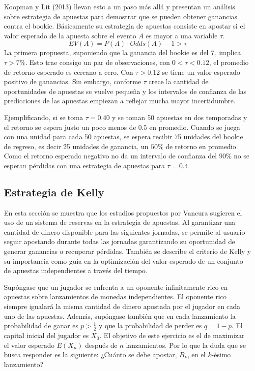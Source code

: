Koopman y Lit (2013) \cite{koopman2013dynamic} llevan esto a un paso más allá y presentan un análisis sobre estrategia de apuestas para demostrar que se pueden obtener ganancias contra el bookie. Básicamente su estrategia de apuestas consiste en apostar si el valor esperado de la apuesta sobre el evento $A$ es mayor a una variable $\tau$.
\[EV(A) = P(A) \cdot Odds(A) - 1 > \tau\]
La primera propuesta, suponiendo que la ganancia del bookie es del $7\/$, implica $\tau > 7\%$. Esto trae consigo un par de observaciones, con $0<\tau<0.12$, el promedio de retorno esperado es cercano a cero. Con $\tau>0.12$ se tiene un valor esperado positivo de ganancias. Sin embargo, conforme $\tau$ crece  la cantidad de oportunidades de apuestas se vuelve pequeña y los intervalos de confianza de las predicciones de las apuestas empiezan a reflejar mucha mayor incertidumbre.

Ejemplificando, si se toma $\tau = 0.40$ y se toman 50 apuestas en dos temporadas y el retorno se espera justo un poco menos de $0.5$ en promedio. Cuando se juega con una unidad para cada 50 apuestas, se espera recibir 75 unidades del bookie de regreso, es decir 25 unidades de ganancia, un $50\%$ de retorno en promedio. Como el retorno esperado negativo no da un intervalo de confianza del $90\%$ no se esperan pérdidas con una estrategia de apuestas para $\tau = 0.4$.

\subsection{Estrategia de Kelly}
\label{subsec:estrategia}

En esta sección se muestra que los estudios propuestos por Vancura \cite{vancura2000finding} sugieren el uso de un sistema de reservas en la estrategia de apuestas. Al garantizar una cantidad de dinero disponible para las siguientes jornadas, se permite al usuario seguir apostando durante todas las jornadas garantizando su oportunidad de generar ganancias o recuperar pérdidas. También se describe el criterio de Kelly \cite{kelly1956new} y su importancia como guía en la optimización del valor esperado de un conjunto de apuestas independientes a través del tiempo.
	
Supóngase que un jugador se enfrenta a un oponente infinitamente rico en apuestas sobre lanzamientos de monedas independientes. El oponente rico siempre igualará la misma cantidad de dinero apostada por el jugador en cada uno de las apuestas. Además, supóngase también que en cada lanzamiento la probabilidad de ganar es $p>\frac{1}{2}$ y que la probabilidad de perder es $q = 1 - p$. El capital inicial del jugador es $X_0$. El objetivo de este ejercicio es el de maximizar el valor esperado $E(X_n)$ después de $n$ lanzamientos. Por lo que la duda que se busca responder es la siguiente: ¿Cuánto se debe apostar, $B_k$, en el $k$-ésimo lanzamiento?

